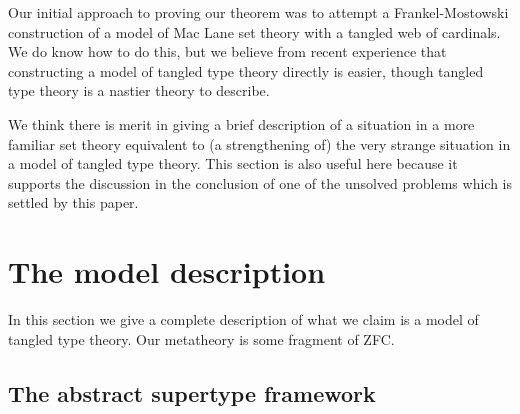 \documentclass[112pt]{article}
\begin{document}
Our initial approach to proving our theorem was to attempt a Frankel-Mostowski construction of a model of Mac Lane set theory with a tangled web of cardinals.  We do know how to do this, but we believe from recent experience that constructing a model of tangled type theory directly is easier, though tangled type theory is a nastier theory to describe.

We think there is merit in giving a brief description of a situation in a more familiar set theory equivalent to (a strengthening of) the very strange situation in a model of tangled type theory.  This section is also useful here because it supports the discussion in the conclusion of one of the unsolved problems which is settled by this paper.

\newpage




\section{The model description}


In this section we give a complete description of what we claim is a model of tangled type theory.  Our metatheory is some fragment of ZFC.

\subsection{The abstract supertype framework}
\end{document}
